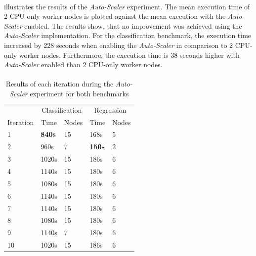 \paragraph{}
 illustrates the results of the \textit{Auto-Scaler} experiment. The mean execution time of 2 CPU-only worker nodes is plotted against the mean execution with the \textit{Auto-Scaler} enabled.
The results show, that no improvement was achieved using the \textit{Auto-Scaler} implementation.
For the classification benchmark, the execution time increased by 228 seconds when enabling the \textit{Auto-Scaler} in comparison to 2 CPU-only worker nodes. Furthermore, the execution time is 38 seconds higher with \textit{Auto-Scaler} enabled than 2 CPU-only worker nodes.

\paragraph{}
\begin{table}[ht]
\centering
\begin{tabular}{@{}l|ll|ll@{}}
\toprule
                               & \multicolumn{2}{c|}{Classification}                   & \multicolumn{2}{c}{Regression}                       \\
\multicolumn{1}{c|}{Iteration} & \multicolumn{1}{c}{Time} & \multicolumn{1}{c|}{Nodes} & \multicolumn{1}{c}{Time} & \multicolumn{1}{c}{Nodes} \\ \midrule
1  & \textbf{840s} & 15 & 168s          & 5 \\
2  & 960s          & 7  & \textbf{150s} & 2 \\
3  & 1020s         & 15 & 186s          & 6 \\
4  & 1140s         & 15 & 180s          & 6 \\
5  & 1080s         & 15 & 180s          & 6 \\
6  & 1140s         & 15 & 180s          & 6 \\
7  & 1140s         & 15 & 180s          & 6 \\
8  & 1080s         & 15 & 180s          & 6 \\
9  & 1140s         & 7  & 180s          & 6 \\
10 & 1020s         & 15 & 186s          & 6 \\ \bottomrule
\end{tabular}
\caption{Results of each iteration during the \textit{Auto-Scaler} experiment for both benchmarks}
\label{table:07_auto-scaler_iterations}
\end{table}
